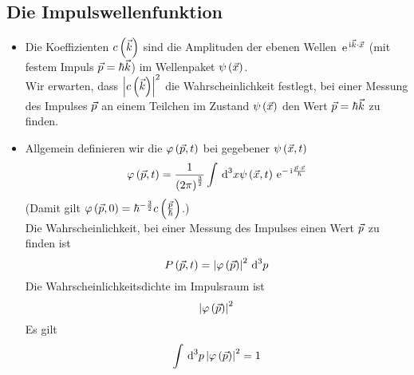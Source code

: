 \subsection{Die Impulswellenfunktion}
\begin{itemize}
  \item Die Koeffizienten $c\of{\vK}$ sind die Amplituden der ebenen Wellen $\e{\mI\vK\cdot\vX}$ (mit festem Impuls $\vP = \hbar \vK$) im Wellenpaket $\psi\of{\vX}$.\\
  Wir erwarten, dass $\Norm{c\of{\vK}}^2$ die Wahrscheinlichkeit festlegt, bei einer Messung des Impulses $\vP$ an einem Teilchen im Zustand $\psi\of{\vX}$ den Wert $\vP = \hbar\vK$ zu finden.
  \item Allgemein definieren wir die  $\varphi\of{\vP,t}$ bei gegebener  $\psi\of{\vX,t}$
  \begin{equation}
    \varphi\of{\vP,t} = \frac{1}{\norBra{2\pi}^\frac{3}{2}} \int \dn{x}{3} \psi\of{\vX,t} \e{-\mI\frac{\vP\cdot\vX}{\hbar}}
  \end{equation}
  (Damit gilt $\varphi\of{\vP,0} = \hbar^{-\frac{3}{2}}c\of{\frac{\vP}{\hbar}}$.)\\
  Die Wahrscheinlichkeit, bei einer Messung des Impulses einen Wert $\vP$ zu finden ist
  \begin{equation}
    \prob{\vP,t} = \Norm{\varphi\of{\vP}}^2\dn{p}{3}
  \end{equation}
  Die Wahrscheinlichkeitsdichte im Impulsraum ist
  \begin{equation}
    \Norm{\varphi\of{\vP}}^2
  \end{equation}
  Es gilt
  \begin{equation}
    \int \dn{p}{3} \Norm{\varphi\of{\vP}}^2 = 1
  \end{equation}
\end{itemize}

